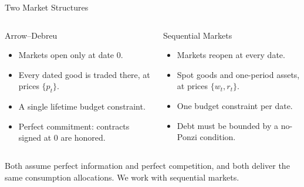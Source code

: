 \documentclass[11pt,aspectratio=169,c]{beamer}
\begin{document}
\begin{frame}{Two Market Structures}
  \begin{columns}[t,onlytextwidth]
    \begin{column}{\tightcolumnwidth}
      \begin{block}{Arrow--Debreu}
        \begin{itemize}
          \item Markets open only at date $0$.
          \item Every dated good is traded there, at prices $\{p_t\}$.
          \item A single lifetime budget constraint.
          \item Perfect commitment: contracts signed at $0$ are honored.
        \end{itemize}
      \end{block}
    \end{column}
    \hspace{\twocolumngutter}
    \begin{column}{\tightcolumnwidth}
      \begin{block}{Sequential Markets}
        \begin{itemize}
          \item Markets reopen at every date.
          \item Spot goods and one-period assets, at prices $\{w_t,r_t\}$.
          \item One budget constraint per date.
          \item Debt must be bounded by a no-Ponzi condition.
        \end{itemize}
      \end{block}
    \end{column}
  \end{columns}

  \vspace{.4em}
  \centering Both assume perfect information and perfect competition, and both
  deliver the same consumption allocations. We work with sequential markets.
\end{frame}
\end{document}
